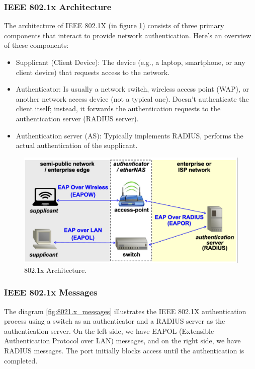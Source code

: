\subsubsection*{IEEE 802.1x Architecture}
The architecture of IEEE 802.1X (in figure \ref{fig:8021x_architecture}) consists of three primary components that interact to provide network authentication. Here's an overview of these components:


\begin{multicols}{2}
\raggedcolumns
    \begin{itemize}
        \item Supplicant (Client Device): The device (e.g., a laptop, smartphone, or any client device) that requests access to the network.
        \item Authenticator:  Is usually a network switch, wireless access point (WAP), or another network access device (not a typical one). Doesn't authenticate the client itself; instead, it forwards the authentication requests to the authentication server (RADIUS server).
        \item Authentication server (AS): Typically implements RADIUS, performs the actual authentication of the supplicant. 
    \end{itemize}
\columnbreak

    
\begin{figure}[H]
    \centering
    \includegraphics[width=\linewidth]{Images/NetSec/8021x_architecture.png}
    \caption{802.1x Architecture.}
    \label{fig:8021x_architecture}
\end{figure}
\end{multicols}

\subsubsection*{IEEE 802.1x Messages}
The diagram \ref{fig:8021.x_messages} illustrates the IEEE 802.1X authentication process using a switch as an authenticator and a RADIUS server as the authentication server.
On the left side, we have EAPOL (Extensible Authentication Protocol over LAN) messages, and on the right side, we have RADIUS messages.  The port initially blocks access until the authentication is completed.

